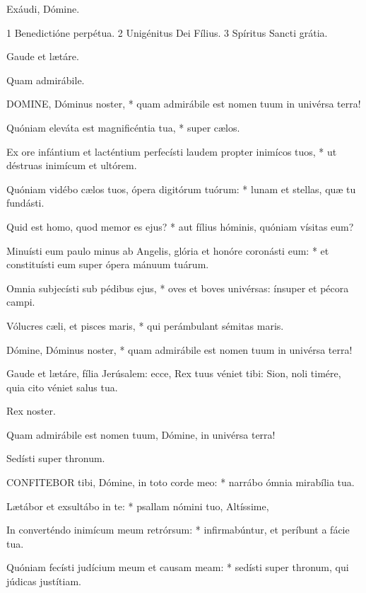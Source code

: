  Exáudi, Dómine.

 1 Benedictióne perpétua. 2 Unigénitus Dei Fílius. 3 Spíritus Sancti grátia.


  Gaude et lætáre.

  Quam admirábile.


\lettrine[lines=2]{D}{OMINE}, Dóminus noster, * quam admirábile est nomen tuum in univérsa terra!

Quóniam eleváta est magnificéntia tua, * super cælos.

Ex ore infántium et lacténtium perfecísti laudem propter inimícos tuos, * ut déstruas inimícum et ultórem.

Quóniam vidébo cælos tuos, ópera digitórum tuórum: * lunam et stellas, quæ tu fundásti.

Quid est homo, quod memor es ejus? * aut fílius hóminis, quóniam vísitas eum?

Minuísti eum paulo minus ab Angelis, glória et honóre coronásti eum: * et constituísti eum super ópera mánuum tuárum.

Omnia subjecísti sub pédibus ejus, * oves et boves univérsas: ínsuper et pécora campi.

Vólucres cæli, et pisces maris, * qui perámbulant sémitas maris.

Dómine, Dóminus noster, * quam admirábile est nomen tuum in univérsa terra!

  Gaude et lætáre, fília Jerúsalem: ecce, Rex tuus véniet tibi: Sion, noli timére, quia cito véniet salus tua.

 Rex noster.

  Quam admirábile est nomen tuum, Dómine, in univérsa terra!

 Sedísti super thronum.


\lettrine[lines=2]{C}{ONFITEBOR} tibi, Dómine, in toto corde meo: * narrábo ómnia mirabília tua.

Lætábor et exsultábo in te: * psallam nómini tuo, Altíssime,

In converténdo inimícum meum retrórsum: * infirmabúntur, et períbunt a fácie tua.

Quóniam fecísti judícium meum et causam meam: * sedísti super thronum, qui júdicas justítiam.


